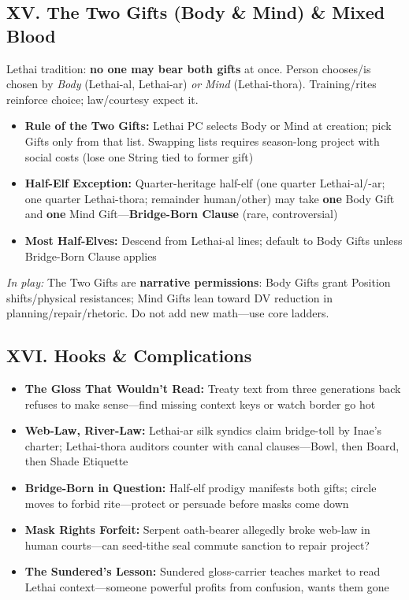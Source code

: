 \documentclass[11pt]{book}
\begin{document}
\subsection{XV. The Two Gifts (Body \& Mind) \& Mixed Blood}
Lethai tradition: \textbf{no one may bear both gifts} at once. Person chooses/is chosen by \emph{Body} (Lethai-al, Lethai-ar) \emph{or} \emph{Mind} (Lethai-thora). Training/rites reinforce choice; law/courtesy expect it.
\begin{itemize}
    \item \textbf{Rule of the Two Gifts:} Lethai PC selects Body or Mind at creation; pick Gifts only from that list. Swapping lists requires season-long project with social costs (lose one String tied to former gift)
    \item \textbf{Half-Elf Exception:} Quarter-heritage half-elf (one quarter Lethai-al/-ar; one quarter Lethai-thora; remainder human/other) may take \textbf{one} Body Gift and \textbf{one} Mind Gift---\textbf{Bridge-Born Clause} (rare, controversial)
    \item \textbf{Most Half-Elves:} Descend from Lethai-al lines; default to Body Gifts unless Bridge-Born Clause applies
\end{itemize}
\textit{In play:} The Two Gifts are \textbf{narrative permissions}: Body Gifts grant Position shifts/physical resistances; Mind Gifts lean toward DV reduction in planning/repair/rhetoric. Do not add new math---use core ladders.

\subsection{XVI. Hooks \& Complications}
\begin{itemize}
    \item \textbf{The Gloss That Wouldn't Read:} Treaty text from three generations back refuses to make sense---find missing context keys or watch border go hot
    \item \textbf{Web-Law, River-Law:} Lethai-ar silk syndics claim bridge-toll by Inae's charter; Lethai-thora auditors counter with canal clauses---Bowl, then Board, then Shade Etiquette
    \item \textbf{Bridge-Born in Question:} Half-elf prodigy manifests both gifts; circle moves to forbid rite---protect or persuade before masks come down
    \item \textbf{Mask Rights Forfeit:} Serpent oath-bearer allegedly broke web-law in human courts---can seed-tithe seal commute sanction to repair project?
    \item \textbf{The Sundered's Lesson:} Sundered gloss-carrier teaches market to read Lethai context---someone powerful profits from confusion, wants them gone
\end{itemize}
\end{document}
